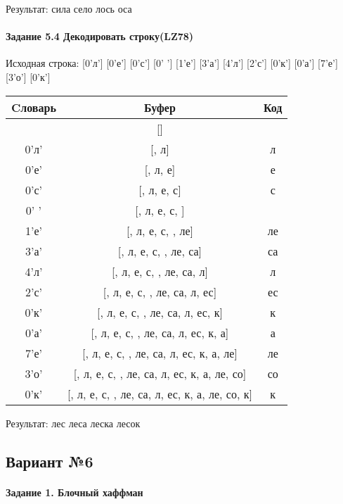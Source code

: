 \documentclass[a4paper, 12pt]{article}
\begin{document}
Результат: сила село лось оса
\pagebreak
\paragraph{Задание 5.4 Декодировать строку(LZ78)\\}

Исходная строка: [0'л'] [0'е'] [0'с'] [0' '] [1'е'] [3'а'] [4'л'] [2'с'] [0'к'] [0'а'] [7'е'] [3'о'] [0'к']\\
\begin{table}[h!]
\centering
\begin{tabular}{|c|c|c|}
\hline
 Cловарь & Буфер & Код  \\ \hline
 & [] & 
\\ \hline
0'л' & [, л] & л
\\ \hline
0'е' & [, л, е] & е
\\ \hline
0'с' & [, л, е, с] & с
\\ \hline
0' ' & [, л, е, с,  ] &  
\\ \hline
1'е' & [, л, е, с,  , ле] & ле
\\ \hline
3'а' & [, л, е, с,  , ле, са] & са
\\ \hline
4'л' & [, л, е, с,  , ле, са,  л] &  л
\\ \hline
2'с' & [, л, е, с,  , ле, са,  л, ес] & ес
\\ \hline
0'к' & [, л, е, с,  , ле, са,  л, ес, к] & к
\\ \hline
0'а' & [, л, е, с,  , ле, са,  л, ес, к, а] & а
\\ \hline
7'е' & [, л, е, с,  , ле, са,  л, ес, к, а,  ле] &  ле
\\ \hline
3'о' & [, л, е, с,  , ле, са,  л, ес, к, а,  ле, со] & со
\\ \hline
0'к' & [, л, е, с,  , ле, са,  л, ес, к, а,  ле, со, к] & к
\\ \hline
\end{tabular}
\end{table}

Результат: лес леса леска лесок
\pagebreak
\subsection{Вариант №6}
\paragraph{Задание 1. Блочный хаффман \\}
\end{document}
